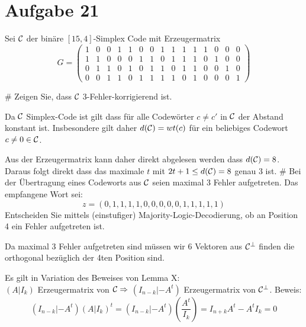 \section*{Aufgabe 21}
Sei $\mathcal{C}$ der binäre $[15,4]$-Simplex Code mit Erzeugermatrix
\begin{equation*}
	G = 
	\begin{pmatrix}
	1 & 0 & 0 & 1 & 1 & 0 & 0 & 1 & 1 & 1 & 1 & 1 & 0 & 0 & 0 \\
	1 & 1 & 0 & 0 & 0 & 1 & 1 & 0 & 1 & 1 & 1 & 0 & 1 & 0 & 0 \\
	0 & 1 & 1 & 0 & 1 & 0 & 1 & 1 & 0 & 1 & 1 & 0 & 0 & 1 & 0 \\
	0 & 0 & 1 & 1 & 0 & 1 & 1 & 1 & 1 & 0 & 1 & 0 & 0 & 0 & 1
	\end{pmatrix}
\end{equation*}
\begin{myList}
#
Zeigen Sie, dass $\mathcal{C}$ 3-Fehler-korrigierend ist.

Da $\mathcal{C}$ Simplex-Code ist gilt dass für alle Codewörter $c\neq c'$ in $\mathcal{C}$ der Abstand konstant ist. Insbesondere gilt daher $d(\mathcal{C}) = wt(c)$ für ein beliebiges Codewort $c \neq 0 \in \mathcal{C}$.\medskip

Aus der Erzeugermatrix kann daher direkt abgelesen werden dass $d(\mathcal{C}) = 8$.
Daraus folgt direkt dass das maximale $t$ mit $2t+1 \leq d(\mathcal{C}) = 8$ genau 3 ist.
#
Bei der Übertragung eines Codeworts aus $\mathcal{C}$ seien maximal 3 Fehler aufgetreten. Das empfangene Wort sei:
\begin{equation*}
	z = (0,1,1,1,1,0,0,0,0,0,1,1,1,1,1)
\end{equation*}
Entscheiden Sie mittels (einstufiger) Majority-Logic-Decodierung, ob an Position 4 ein Fehler aufgetreten ist.\medskip

Da maximal 3 Fehler aufgetreten sind müssen wir 6 Vektoren aus $\mathcal{C}^\bot$ finden die orthogonal bezüglich der 4ten Position sind.\medskip

Es gilt in Variation des Beweises von Lemma X:\\
$(A |I_k)$ Erzeugermatrix von $\mathcal{C} \Rightarrow$ $(I_{n-k}|-A^t)$ Erzeugermatrix von $\mathcal{C}^\bot$.
Beweis:
\begin{equation*}
	(I_{n-k}|-A^t) (A|I_k)^t = (I_{n-k}|-A^t)\left(\frac{A^t}{I_k}\right) = I_{n+k}A^t - A^tI_k = 0
\end{equation*}\medskip


\end{myList}
